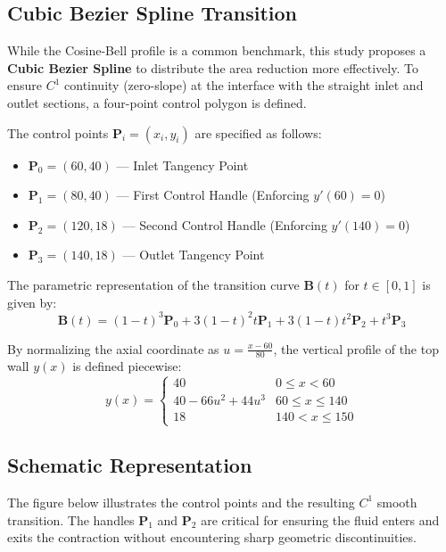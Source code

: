 \documentclass[12pt, a4paper]{article}
\begin{document}
\subsection{Cubic Bezier Spline Transition}
While the Cosine-Bell profile is a common benchmark, this study proposes a \textbf{Cubic Bezier Spline} to distribute the area reduction more effectively. To ensure $C^1$ continuity (zero-slope) at the interface with the straight inlet and outlet sections, a four-point control polygon is defined.

The control points $\mathbf{P}_i = (x_i, y_i)$ are specified as follows:
\begin{itemize}
	\item $\mathbf{P}_0 = (60, 40)$ --- Inlet Tangency Point
	\item $\mathbf{P}_1 = (80, 40)$ --- First Control Handle (Enforcing $y'(60) = 0$)
	\item $\mathbf{P}_2 = (120, 18)$ --- Second Control Handle (Enforcing $y'(140) = 0$)
	\item $\mathbf{P}_3 = (140, 18)$ --- Outlet Tangency Point
\end{itemize}

The parametric representation of the transition curve $\mathbf{B}(t)$ for $t \in [0, 1]$ is given by:
\begin{equation}
	\mathbf{B}(t) = (1-t)^3 \mathbf{P}_0 + 3(1-t)^2 t \mathbf{P}_1 + 3(1-t) t^2 \mathbf{P}_2 + t^3 \mathbf{P}_3
\end{equation}

By normalizing the axial coordinate as $u = \frac{x - 60}{80}$, the vertical profile of the top wall $y(x)$ is defined piecewise:
\begin{equation}
	y(x) = 
	\begin{cases} 
		40 & 0 \le x < 60 \\
		40 - 66u^2 + 44u^3 & 60 \le x \le 140 \\
		18 & 140 < x \le 150 
	\end{cases}
\end{equation}

\subsection{Schematic Representation}
The figure below illustrates the control points and the resulting $C^1$ smooth transition. The handles $\mathbf{P}_1$ and $\mathbf{P}_2$ are critical for ensuring the fluid enters and exits the contraction without encountering sharp geometric discontinuities.
\end{document}
